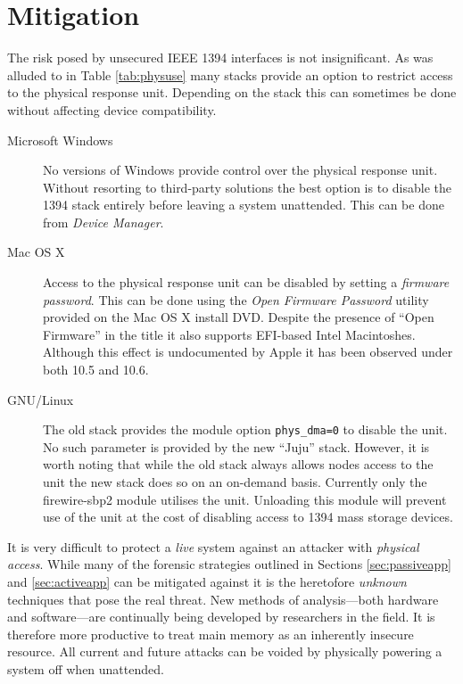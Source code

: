 \documentclass[numbers=noenddot,      %
               abstract,              %
               captions=tableheading, %
               DIV=8]                 %
              {scrartcl}
\begin{document}
\section{Mitigation}
\label{sec:mitigation}

The risk posed by unsecured IEEE 1394 interfaces is not
insignificant. As was alluded to in Table \ref{tab:physuse} many stacks
provide an option to restrict access to the physical response
unit. Depending on the stack this can sometimes be done without
affecting device compatibility.

\begin{description}
\item[Microsoft Windows] No versions of Windows provide control over the
  physical response unit. Without resorting to third-party solutions the
  best option is to disable the 1394 stack entirely before leaving a
  system unattended. This can be done from \emph{Device Manager}.
\item[Mac OS X] Access to the physical response unit can be disabled by
  setting a \emph{firmware password}. This can be done using the
  \emph{Open Firmware Password} utility provided on the Mac OS X install
  DVD. Despite the presence of ``Open Firmware'' in the title it also
  supports EFI-based Intel Macintoshes. Although this effect is
  undocumented by Apple it has been observed under both 10.5 and
  10.6.
\item[GNU/Linux] The old stack provides the module option
  \verb:phys_dma=0: to disable the unit. No such parameter is provided
  by the new ``Juju'' stack. However, it is worth noting that while the
  old stack always allows nodes access to the unit the new stack does so
  on an on-demand basis. Currently only the firewire-sbp2 module
  utilises the unit. Unloading this module will prevent use of the unit
  at the cost of disabling access to 1394 mass storage devices.
\end{description}

It is very difficult to protect a \emph{live} system against an attacker
with \emph{physical access}. While many of the forensic strategies
outlined in Sections \ref{sec:passiveapp} and \ref{sec:activeapp} can be
mitigated against it is the heretofore \emph{unknown} techniques that
pose the real threat. New methods of analysis---both hardware and
software---are continually being developed by researchers in the
field. It is therefore more productive to treat main memory as an
inherently insecure resource. All current and future attacks can be
voided by physically powering a system off when unattended.
\end{document}
